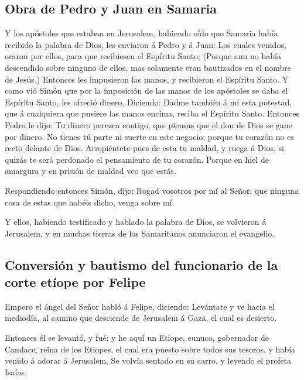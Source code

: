 \hypertarget{obra-de-pedro-y-juan-en-samaria}{%
\subsection{Obra de Pedro y Juan en
Samaria}\label{obra-de-pedro-y-juan-en-samaria}}

 Y los apóstoles que estaban en Jerusalem, habiendo oído
que Samaria había recibido la palabra de Dios, les enviaron á Pedro y á
Juan:  Los cuales venidos, oraron por ellos, para que
recibiesen el Espíritu Santo;  (Porque aun no había
descendido sobre ninguno de ellos, mas solamente eran bautizados en el
nombre de Jesús.)  Entonces les impusieron las manos, y
recibieron el Espíritu Santo.  Y como vió Simón que por
la imposición de las manos de los apóstoles se daba el Espíritu Santo,
les ofreció dinero,  Diciendo: Dadme también á mí esta
potestad, que á cualquiera que pusiere las manos encima, reciba el
Espíritu Santo.  Entonces Pedro le dijo: Tu dinero
perezca contigo, que piensas que el don de Dios se gane por dinero.
 No tienes tú parte ni suerte en este negocio; porque tu
corazón no es recto delante de Dios.  Arrepiéntete pues
de esta tu maldad, y ruega á Dios, si quizás te será perdonado el
pensamiento de tu corazón.  Porque en hiel de amargura y
en prisión de maldad veo que estás.

 Respondiendo entonces Simón, dijo: Rogad vosotros por mí
al Señor, que ninguna cosa de estas que habéis dicho, venga sobre mí.

 Y ellos, habiendo testificado y hablado la palabra de
Dios, se volvieron á Jerusalem, y en muchas tierras de los Samaritanos
anunciaron el evangelio.

\hypertarget{conversiuxf3n-y-bautismo-del-funcionario-de-la-corte-etuxedope-por-felipe}{%
\subsection{Conversión y bautismo del funcionario de la corte etíope por
Felipe}\label{conversiuxf3n-y-bautismo-del-funcionario-de-la-corte-etuxedope-por-felipe}}

 Empero el ángel del Señor habló á Felipe, diciendo:
Levántate y ve hacia el mediodía, al camino que desciende de Jerusalem á
Gaza, el cual es desierto.

 Entonces él se levantó, y fué: y he aquí un Etiope,
eunuco, gobernador de Candace, reina de los Etiopes, el cual era puesto
sobre todos sus tesoros, y había venido á adorar á Jerusalem,
 Se volvía sentado en su carro, y leyendo el profeta
Isaías.

